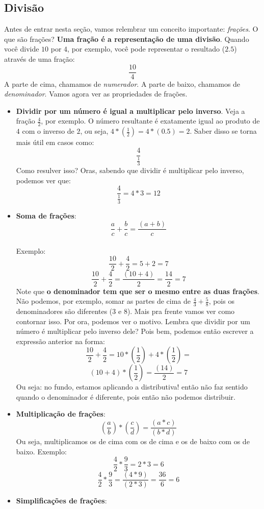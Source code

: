 \documentclass[11pt]{article}
\begin{document}
\subsection{Divisão}
Antes de entrar nesta seção, vamos relembrar um conceito importante: 
\textit{frações}. O que são frações? \textbf{Uma fração é a representação de
uma divisão}. Quando você divide $10$ por $4$, por exemplo, você pode 
representar o resultado ($2.5$) através de uma fração:
$$\frac{10}{4}$$
A parte de cima, chamamos de \textit{numerador}. A parte de baixo, chamamos de
\textit{denominador}. Vamos agora ver as propriedades de frações.
\begin{itemize}
	\item \textbf{Dividir por um número é igual a multiplicar pelo inverso}.
	Veja a fração $\frac{4}{2}$, por exemplo. O número resultante é exatamente
	igual ao produto de $4$ com o inverso de $2$, ou seja,
	$4*(\frac{1}{2}) = 4*(0.5) = 2$. Saber disso se torna mais útil em
	casos como:
	$$\frac{4}{\frac{1}{3}}$$
	Como resulver isso? Oras, sabendo que dividir é multiplicar pelo inverso,
	podemos ver que:
	$$\frac{4}{\frac{1}{3}} = 4*3 = 12$$
	\item \textbf{Soma de frações}:
	$$\frac{a}{c} + \frac{b}{c} = \frac{(a + b)}{c}$$
	\paragraph{}
	Exemplo:
	$$\frac{10}{2} + \frac{4}{2} = 5 + 2 = 7$$
	$$\frac{10}{2} + \frac{4}{2} = \frac{(10 + 4)}{2} = \frac{14}{2} = 7$$
	Note que \textbf{o denominador tem que ser o mesmo entre as duas frações}.
	Não podemos, por exemplo, somar as partes de cima de $\frac{4}{3} + 
	\frac{5}{8}$, pois os denominadores são diferentes ($3$ e $8$). Mais pra 
	frente vamos ver como contornar isso. Por ora, podemos ver o motivo. Lembra
	que dividir por um número é multiplicar pelo inverso dele? Pois bem, podemos
	então escrever a expressão anterior na forma:
	$$\frac{10}{2} + \frac{4}{2} = 10*(\frac{1}{2}) + 4*(\frac{1}{2}) =$$
	$$(10 + 4)*(\frac{1}{2}) = \frac{(14)}{2} = 7$$
	Ou seja: no fundo, estamos aplicando a distributiva! então não faz sentido
	quando o denominador é diferente, pois então não podemos distribuir.
	\item \textbf{Multiplicação de frações}:
	$$(\frac{a}{b})*(\frac{c}{d}) = \frac{(a*c)}{(b*d)}$$
	Ou seja, multiplicamos os de cima com os de cima e os de baixo com os de
	baixo. Exemplo:
	$$\frac{4}{2} * \frac{9}{3} = 2 * 3 = 6$$
	$$\frac{4}{2} * \frac{9}{3} = \frac{(4*9)}{(2*3)} = \frac{36}{6} = 6$$
	\item \textbf{Simplificações de frações}:

\end{itemize}
\end{document}
